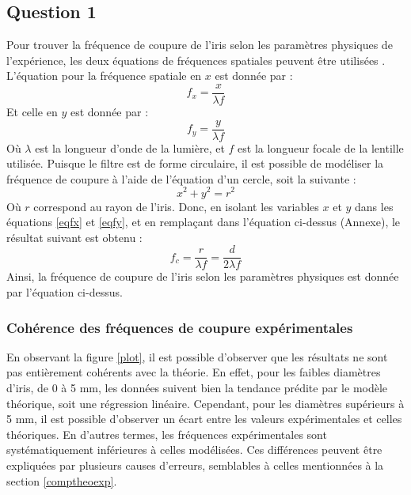 \documentclass[11pt,letterpaper]{article}
\begin{document}
\subsection{Question 1}\label{q1}

Pour trouver la fréquence de coupure de l'iris selon les paramètres physiques de l'expérience, les deux équations de fréquences spatiales peuvent être utilisées \cite{sheehy_experience_2024}. L'équation pour la fréquence spatiale en $x$ est donnée par :
\begin{equation}
  f_{x}=\frac{x}{\lambda f}
  \label{eqfx}
\end{equation}
Et celle en $y$ est donnée par :
\begin{equation}
  f_{y}=\frac{y}{\lambda f}
  \label{eqfy}
\end{equation}
Où $\lambda$ est la longueur d'onde de la lumière, et $f$ est la longueur focale de la lentille utilisée. Puisque le filtre est de forme circulaire, il est possible de modéliser la fréquence de coupure à l'aide de l'équation d'un cercle, soit la suivante :
\begin{equation}
  x^{2}+y^{2}=r^{2}
  \label{eqcercle}
\end{equation}
Où $r$ correspond au rayon de l'iris. Donc, en isolant les variables $x$ et $y$ dans les équations \ref{eqfx} et \ref{eqfy}, et en remplaçant dans l'équation ci-dessus (Annexe), le résultat suivant est obtenu :
\begin{equation}
  f_{c}=\frac{r}{\lambda f}=\frac{d}{2\lambda f}
  \label{eqfc}
\end{equation}
Ainsi, la fréquence de coupure de l'iris selon les paramètres physiques est donnée par l'équation ci-dessus.

\subsubsection{Cohérence des fréquences de coupure expérimentales}
En observant la figure \ref{plot}, il est possible d'observer que les résultats ne sont pas entièrement cohérents avec la théorie. En effet, pour les faibles diamètres d'iris, de 0 à 5 mm, les données suivent bien la tendance prédite par le modèle théorique, soit une régression linéaire. Cependant, pour les diamètres supérieurs à 5 mm, il est possible d'observer un écart entre les valeurs expérimentales et celles théoriques. En d'autres termes, les fréquences expérimentales sont systématiquement inférieures à celles modélisées. Ces différences peuvent être expliquées par plusieurs causes d'erreurs, semblables à celles mentionnées à la section \ref{comptheoexp}.
\end{document}
